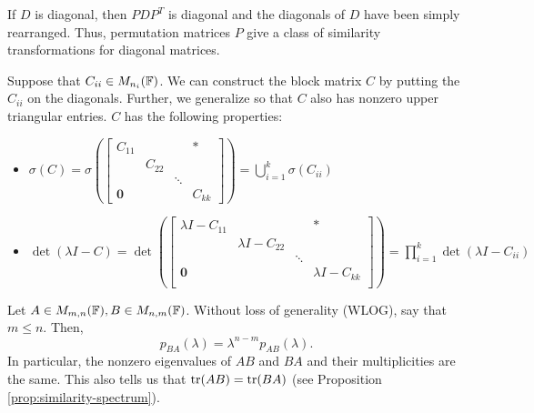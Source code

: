 \begin{note*}
If $D$ is diagonal, then $PDP^T$ is diagonal and the diagonals of $D$ have been simply rearranged. Thus, permutation matrices $P$ give a class of similarity transformations for diagonal matrices.
\end{note*}

\noindent Suppose that $C_{ii} \in M_{n_i}(\mathbb F)$. We can construct the block matrix $C$ by putting the $C_{ii}$ on the diagonals. Further, we generalize so that $C$ also has nonzero upper triangular entries. $C$ has the following properties:
\begin{itemize}
    \item $\sigma(C) = \sigma
    \left(
    \begin{bmatrix}
    C_{11} & & & * \\
           & C_{22} & & \\
           & & \ddots & \\
        \textbf{0} & & & C_{kk}
    \end{bmatrix}
    \right) = \bigcup\limits_{i=1}^k \sigma(C_{ii})$
    \item $\det(\lambda I - C) = \det
    \left(
    \begin{bmatrix}
    \lambda I - C_{11} & & & * \\
      & \lambda I - C_{22} & & \\
      & & \ddots & \\
    \textbf{0} & & & \lambda I - C_{kk} \\
    \end{bmatrix}
    \right)
    = \prod\limits_{i=1}^k \det(\lambda I - C_{ii})
    $
\end{itemize}

\begin{theorem}
\label{thm:char-poly-matrix-prod}
Let $A \in M_{m,n}(\mathbb F), B \in M_{n, m}(\mathbb F)$. Without loss of generality (WLOG), say that $m \leq n$. Then,
$$
p_{BA}(\lambda) = \lambda^{n-m}p_{AB}(\lambda).
$$
In particular, the nonzero eigenvalues of $AB$ and $BA$ and their multiplicities are the same. This also tells us that $\operatorname{tr}(AB) = \operatorname{tr}(BA)$ (see Proposition \ref{prop:similarity-spectrum}).
\end{theorem}

